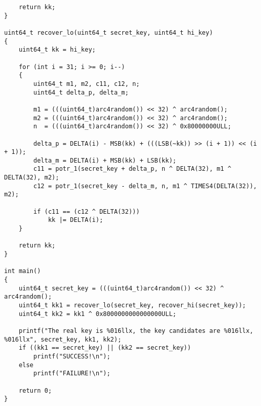 \begin{verbatim}
	return kk;
}

uint64_t recover_lo(uint64_t secret_key, uint64_t hi_key)
{
	uint64_t kk = hi_key;

	for (int i = 31; i >= 0; i--)
	{
		uint64_t m1, m2, c11, c12, n;
		uint64_t delta_p, delta_m;

		m1 = (((uint64_t)arc4random()) << 32) ^ arc4random();
		m2 = (((uint64_t)arc4random()) << 32) ^ arc4random();
		n  = (((uint64_t)arc4random()) << 32) ^ 0x80000000ULL;

		delta_p = DELTA(i) - MSB(kk) + (((LSB(~kk)) >> (i + 1)) << (i + 1));
		delta_m = DELTA(i) + MSB(kk) + LSB(kk);
		c11 = potr_1(secret_key + delta_p, n ^ DELTA(32), m1 ^ DELTA(32), m2);
		c12 = potr_1(secret_key - delta_m, n, m1 ^ TIMES4(DELTA(32)), m2);

		if (c11 == (c12 ^ DELTA(32)))
			kk |= DELTA(i);
	}

	return kk;
}

int main()
{
	uint64_t secret_key = (((uint64_t)arc4random()) << 32) ^ arc4random();
	uint64_t kk1 = recover_lo(secret_key, recover_hi(secret_key));
	uint64_t kk2 = kk1 ^ 0x8000000000000000ULL;

	printf("The real key is %016llx, the key candidates are %016llx, %016llx", secret_key, kk1, kk2);
	if ((kk1 == secret_key) || (kk2 == secret_key))
		printf("SUCCESS!\n");
	else
		printf("FAILURE!\n");

	return 0;
}
\end{verbatim}

\renewcommand\thesection{\arabic{section}}
